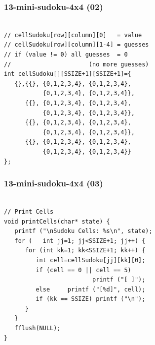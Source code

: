 \documentclass[aspectratio=169, xcolor=table, notheorems, hyperref={pdfpagelabels=false}]{beamer}
\begin{document}
\begin{frame}[fragile]
\frametitle{13-mini-sudoku-4x4 (02)}
\begin{lstlisting}[basicstyle=\ttfamily\large]        %  54

// cellSudoku[row][column][0]   = value
// cellSudoku[row][column][1-4] = guesses
// if (value != 0) all guesses  = 0 
//                      (no more guesses)
int cellSudoku[][SSIZE+1][SSIZE+1]={
   {},{{}, {0,1,2,3,4}, {0,1,2,3,4}, 
           {0,1,2,3,4}, {0,1,2,3,4}},
      {{}, {0,1,2,3,4}, {0,1,2,3,4}, 
           {0,1,2,3,4}, {0,1,2,3,4}},
      {{}, {0,1,2,3,4}, {0,1,2,3,4},
           {0,1,2,3,4}, {0,1,2,3,4}},
      {{}, {0,1,2,3,4}, {0,1,2,3,4}, 
           {0,1,2,3,4}, {0,1,2,3,4}}
};

\end{lstlisting}
\end{frame}

\begin{frame}[fragile]
\frametitle{13-mini-sudoku-4x4 (03)}
\begin{lstlisting}[basicstyle=\ttfamily\large]        %  54

// Print Cells
void printCells(char* state) {
   printf ("\nSudoku Cells: %s\n", state);
   for (   int jj=1; jj<SSIZE+1; jj++) {
      for (int kk=1; kk<SSIZE+1; kk++) {
         int cell=cellSudoku[jj][kk][0];
         if (cell == 0 || cell == 5) 
                         printf ("[ ]");
         else     printf ("[%d]", cell);
         if (kk == SSIZE) printf ("\n");
      }
   }
   fflush(NULL);
}

\end{lstlisting}
\end{frame}
\end{document}
